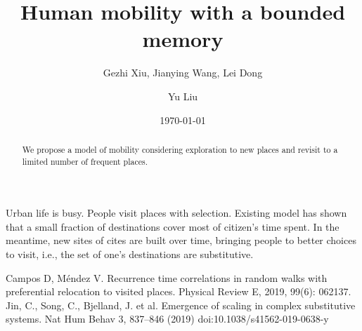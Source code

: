 \documentclass[reprint,unsortedaddress,amsmath,amssymb,floatfix,aps,prl,showkeys]{revtex4-2}
\begin{document}
\title{Human mobility with a bounded memory}
\author{Gezhi Xiu, Jianying Wang, Lei Dong}
\author{Yu Liu}
\date{\today}

\begin{abstract}
    We propose a model of mobility considering exploration to new places and revisit to a limited number of frequent places.
\end{abstract}

\maketitle

Urban life is busy. People visit places with selection. Existing model has shown that a small fraction of destinations cover most of citizen's time spent. In the meantime, new sites of cites are built over time, bringing people to better choices to visit, i.e., the set of one's destinations are substitutive\cite{ref2}.




% 
\begin{thebibliography}{99}  
     Campos D, Méndez V. Recurrence time correlations in random walks with preferential relocation to visited places. Physical Review E, 2019, 99(6): 062137.
     Jin, C., Song, C., Bjelland, J. et al. Emergence of scaling in complex substitutive systems. Nat Hum Behav 3, 837–846 (2019) doi:10.1038/s41562-019-0638-y
\end{thebibliography}
\end{document}
